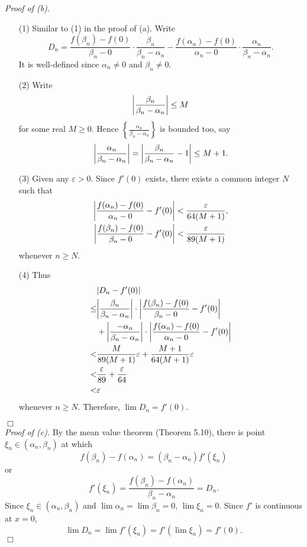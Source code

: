 \documentclass{article}
\begin{document}
\emph{Proof of (b).}
\begin{enumerate}
  \item[(1)]
  Similar to (1) in the proof of (a).
  Write
  \[
    D_n = \frac{f(\beta_n) - f(0)}{\beta_n - 0} \cdot \frac{\beta_n}{\beta_n - \alpha_n}
      - \frac{f(\alpha_n) - f(0)}{\alpha_n - 0} \cdot \frac{\alpha_n}{\beta_n - \alpha_n}.
  \]
  It is well-defined since $\alpha_n \neq 0$ and $\beta_n \neq 0$.

  \item[(2)]
  Write
  \[
    \abs{ \frac{\beta_n}{\beta_n-\alpha_n} } \leq M
  \]
  for some real $M \geq 0$.
  Hence $\left\{\frac{\alpha_n}{\beta_n-\alpha_n}\right\}$ is bounded too, say
  \[
    \abs{ \frac{\alpha_n}{\beta_n-\alpha_n} }
    = \abs{ \frac{\beta_n}{\beta_n-\alpha_n} - 1 } \leq M + 1.
  \]

  \item[(3)]
  Given any $\varepsilon > 0$.
  Since $f'(0)$ exists, there exists a common integer $N$ such that
  \begin{align*}
    \abs{\frac{f(\alpha_n) - f(0)}{\alpha_n - 0} - f'(0)} &< \frac{\varepsilon}{64(M+1)}, \\
    \abs{\frac{f(\beta_n) - f(0)}{\beta_n - 0} - f'(0)} &< \frac{\varepsilon}{89(M+1)}
  \end{align*}
  whenever $n \geq N$.

  \item[(4)]
  Thus
  \begin{align*}
    &|D_n - f'(0)| \\
    \leq&
    \abs{\frac{\beta_n}{\beta_n - \alpha_n}}
      \cdot \abs{\frac{f(\beta_n) - f(0)}{\beta_n - 0} - f'(0)} \\
      &+ \abs{\frac{-\alpha_n}{\beta_n - \alpha_n}}
      \cdot \abs{\frac{f(\alpha_n) - f(0)}{\alpha_n - 0} - f'(0)} \\
    <&
    \frac{M}{89(M+1)} \varepsilon + \frac{M+1}{64(M+1)} \varepsilon \\
    <&
    \frac{\varepsilon}{89} + \frac{\varepsilon}{64} \\
    <& \varepsilon
  \end{align*}
  whenever $n \geq N$.
  Therefore, $\lim{D_n} = f'(0)$.
\end{enumerate}
$\Box$ \\

\emph{Proof of (c).}
By the mean value theorem (Theorem 5.10),
there is point $\xi_n \in (\alpha_n,\beta_n)$ at which
\[
  f(\beta_n) - f(\alpha_n) = (\beta_n - \alpha_n) f'(\xi_n)
\]
or
\[
  f'(\xi_n) = \frac{f(\beta_n) - f(\alpha_n)}{\beta_n - \alpha_n} = D_n.
\]
Since $\xi_n \in (\alpha_n,\beta_n)$ and $\lim \alpha_n = \lim \beta_n = 0$,
$\lim \xi_n = 0$.
Since $f'$ is continuous at $x = 0$,
\[
  \lim D_n = \lim f'(\xi_n) = f'(\lim \xi_n) = f'(0).
\]
$\Box$ \\
\end{document}
